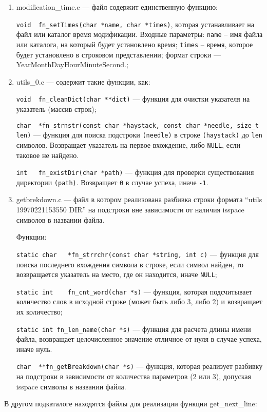 \begin{enumerate}
	\item  modification\_time.c --- файл содержит единственную функцию: 
	
	\verb|void	fn_setTimes(char *name, char *times)|, которая устанавливает на файл или каталог время модификации. Входные параметры: \verb|name| -- имя файла или каталога, на который будет установлено время; \verb|times| -- время, которое будет установлено в строковом представлении; формат строки --- YearMonthDayHourMinuteSecond.;
	
	\item utils\_0.c --- содержит такие функции, как:
	
	\verb|void	fn_cleanDict(char **dict)| --- функция для очистки указателя на указатель (массив строк);
	
	\verb|char	*fn_strnstr(const char *haystack, const char *needle, size_t len)| --- функция для поиска подстроки \verb|(needle)| в строке \verb|(haystack)| до \verb|len| символов. Возвращает указатель на первое вхождение, либо \verb|NULL|, если таковое не найдено.
	
	\verb|int	fn_existDir(char *path)| --- функция для проверки существования директории \verb|(path)|. Возвращает \verb|0| в случае успеха, иначе \verb|-1|.
	
	\item getbrekdown.c --- файл в котором реализована разбивка строки формата ``utils 19970221153550 DIR'' на подстроки вне зависимости от наличия isspace символов в названии файла.
	
	Функции:
	
	\verb|static char	*fn_strrchr(const char *string, int c)| --- функция для поиска последнего вхождения символа в строке, если символ найден, то возвращается указатель на место, где он находится, иначе \verb|NULL|;
	
	\verb|static int	fn_cnt_word(char *s)| --- функция, которая подсчитывает количество слов в исходной строке (может быть либо 3, либо 2) и возвращает их количество;
	
	\verb|static int fn_len_name(char *s)| --- функция для расчета длины имени файла, возвращает целочисленное значение отличное от нуля в случае успеха, иначе нуль.
	
	\verb|char	**fn_getBreakdown(char *s)| --- функция, которая реализует разбивку на подстроки в зависимости от количества параметров (2 или 3), допуская isspace символы в названии файла.
\end{enumerate}
В другом подкаталоге находятся файлы для реализации функции get\_next\_line:
